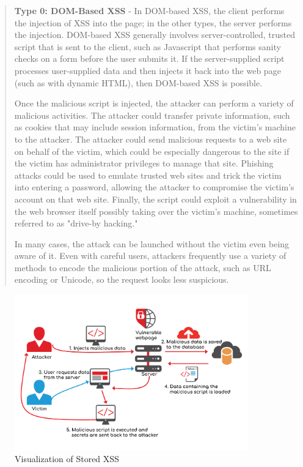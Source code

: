 \begin{quote}
	\textbf{Type 0: DOM-Based XSS} - In DOM-based XSS, the client performs the injection of XSS into the page; in the other types, the server performs the injection. DOM-based XSS generally involves server-controlled, trusted script that is sent to the client, such as Javascript that performs sanity checks on a form before the user submits it. If the server-supplied script processes user-supplied data and then injects it back into the web page (such as with dynamic HTML), then DOM-based XSS is possible.

	Once the malicious script is injected, the attacker can perform a variety of malicious activities. The attacker could transfer private information, such as cookies that may include session information, from the victim's machine to the attacker. The attacker could send malicious requests to a web site on behalf of the victim, which could be especially dangerous to the site if the victim has administrator privileges to manage that site. Phishing attacks could be used to emulate trusted web sites and trick the victim into entering a password, allowing the attacker to compromise the victim's account on that web site. Finally, the script could exploit a vulnerability in the web browser itself possibly taking over the victim's machine, sometimes referred to as "drive-by hacking."

	In many cases, the attack can be launched without the victim even being aware of it. Even with careful users, attackers frequently use a variety of methods to encode the malicious portion of the attack, such as URL encoding or Unicode, so the request looks less suspicious. \cite{mitre/XSS}
\end{quote}

\begin{figure}
	\centering
		\includegraphics[width=0.9\textwidth]{storedxss.png}
	\caption{Visualization of Stored XSS \cite{acunetix/storedxss}}
	\label{fig:storedxss}
\end{figure}

